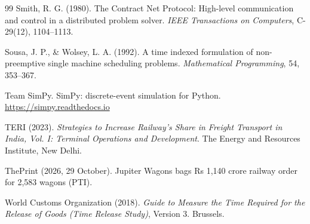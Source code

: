 \begin{thebibliography}{99}
Smith, R. G. (1980). The Contract Net Protocol: High-level communication and control in a distributed problem solver. \textit{IEEE Transactions on Computers}, C-29(12), 1104--1113.

Sousa, J. P., \& Wolsey, L. A. (1992). A time indexed formulation of non-preemptive single machine scheduling problems. \textit{Mathematical Programming}, 54, 353--367.

Team SimPy. SimPy: discrete-event simulation for Python. \url{https://simpy.readthedocs.io}

TERI (2023). \textit{Strategies to Increase Railway's Share in Freight Transport in India, Vol. I: Terminal Operations and Development}. The Energy and Resources Institute, New Delhi.

ThePrint (2026, 29 October). Jupiter Wagons bags Rs 1,140 crore railway order for 2,583 wagons (PTI).

World Customs Organization (2018). \textit{Guide to Measure the Time Required for the Release of Goods (Time Release Study)}, Version 3. Brussels.

\end{thebibliography}
